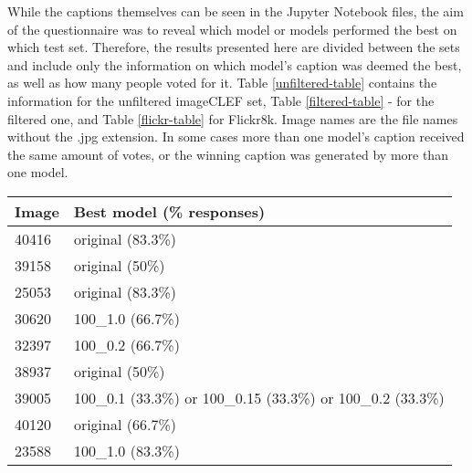\documentclass[11pt]{article}
\begin{document}
While the captions themselves can be seen in the Jupyter Notebook files, the aim of the questionnaire was to reveal which model or models performed the best on which test set. Therefore, the results presented here are divided between the sets and include only the information on which model's caption was deemed the best, as well as how many people voted for it. Table \ref{unfiltered-table} contains the information for the unfiltered imageCLEF set, Table \ref{filtered-table} - for the filtered one, and Table \ref{flickr-table} for Flickr8k. Image names are the file names without the .jpg extension. In some cases more than one model's caption received the same amount of votes, or the winning caption was generated by more than one model.

\begin{table}[h]
    \begin{center}
        \begin{tabular}{|p{1cm}|p{4.5cm}|}
            \hline \bf Image & \bf Best model (\% responses)                                                                 \\ \hline
            40416            & original (83.3\%)                                                                             \\
            39158            & original (50\%)                                                                               \\
            25053            & original (83.3\%)                                                                             \\
            30620            & 100\_1.0 (66.7\%)                                                                             \\
            32397            & 100\_0.2 (66.7\%)                                                                             \\
            38937            & original (50\%)                                                                               \\
            39005            & 100\_0.1 (33.3\%) or 100\_0.15 (33.3\%) or 100\_0.2 (33.3\%)                                  \\
            40120            & original (66.7\%)                                                                             \\
            23588            & 100\_1.0 (83.3\%)                                                                             \\

\end{tabular}
\end{center}
\end{table}
\end{document}
